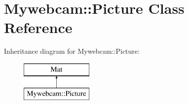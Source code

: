 \hypertarget{class_mywebcam_1_1_picture}{}\section{Mywebcam\+:\+:Picture Class Reference}
\label{class_mywebcam_1_1_picture}
Inheritance diagram for Mywebcam\+:\+:Picture\+:\begin{figure}[H]
\begin{center}
\leavevmode
\includegraphics[height=2.000000cm]{class_mywebcam_1_1_picture}
\end{center}
\end{figure}
